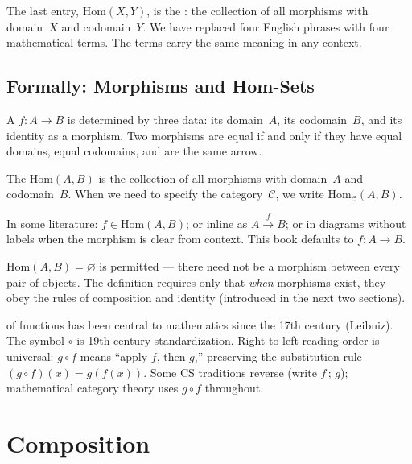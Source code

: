The last entry, $\mathrm{Hom}(X, Y)$, is the : the collection
of all morphisms with domain~$X$ and codomain~$Y$. We have replaced four
English phrases with four mathematical terms. The terms carry the same meaning
in any context.

\subsection{Formally: Morphisms and Hom-Sets}

A  $f : A \to B$ is determined by three data: its domain~$A$,
its codomain~$B$, and its identity as a morphism. Two morphisms are equal if
and only if they have equal domains, equal codomains, and are the same arrow.

The  $\mathrm{Hom}(A, B)$ is the collection of all morphisms
with domain~$A$ and codomain~$B$. When we need to specify the category~$\mathcal{C}$,
we write $\mathrm{Hom}_{\mathcal{C}}(A, B)$.

In some literature: $f \in \mathrm{Hom}(A, B)$; or inline as
$A \xrightarrow{f} B$; or in diagrams without labels when the morphism is
clear from context. This book defaults to $f : A \to B$.

$\mathrm{Hom}(A, B) = \varnothing$ is permitted --- there need not be a
morphism between every pair of objects. The definition requires only that
\emph{when} morphisms exist, they obey the rules of composition and identity
(introduced in the next two sections).


\begin{nameorigin}
 of functions has been central to mathematics since
the 17th century (Leibniz). The symbol $\circ$ is 19th-century
standardization. Right-to-left reading order is universal: $g \circ f$
means ``apply $f$, then $g$,'' preserving the substitution rule
$(g \circ f)(x) = g(f(x))$. Some CS traditions reverse (write $f \,;\, g$);
mathematical category theory uses $g \circ f$ throughout.
\end{nameorigin}

\section{Composition}
\label{sec:composition}

